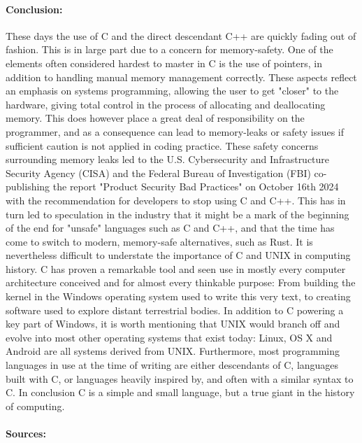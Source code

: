 \documentclass{report}%
\begin{document}
\paragraph{Conclusion:}
These days the use of C and the direct descendant C++ are quickly fading out of fashion. This is in large part due to a concern for memory-safety. One of the elements often considered hardest to master in C is the use of pointers, in addition to handling manual memory management correctly. These aspects reflect an emphasis on systems programming, allowing the user to get "closer" to the hardware, giving total control in the process of allocating and deallocating memory. This does however place a great deal of responsibility on the programmer, and as a consequence can lead to memory-leaks or safety issues if sufficient caution is not applied in coding practice. These safety concerns surrounding memory leaks led to the U.S. Cybersecurity and Infrastructure Security Agency (CISA) and the Federal Bureau of Investigation (FBI) co-publishing the report "Product Security Bad Practices" on October 16th 2024 with the recommendation for developers to stop using C and C++. This has in turn led to speculation in the industry that it might be a mark of the beginning of the end for "unsafe" languages such as C and C++, and that the time has come to switch to modern, memory-safe alternatives, such as Rust. It is nevertheless difficult to understate the importance of C and UNIX in computing history. C has proven a remarkable tool and seen use in mostly every computer architecture conceived and for almost every thinkable purpose: From building the kernel in the Windows operating system used to write this very text, to creating software used to explore distant terrestrial bodies. In addition to C powering a key part of Windows, it is worth mentioning that UNIX would branch off and evolve into most other operating systems that exist today: Linux, OS X and Android are all systems derived from UNIX. Furthermore, most programming languages in use at the time of writing are either descendants of C, languages built with C, or languages heavily inspired by, and often with a similar syntax to C. In conclusion C is a simple and small language, but a true giant in the history of computing.

\newpage
\paragraph{Sources:}\noindent\\
\end{document}
